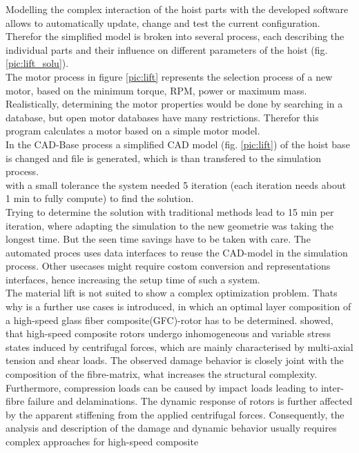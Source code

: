 Modelling the complex interaction of the hoist parts with the developed software allows to automatically update, change and test the current configuration.
Therefor the simplified model is broken into several process, each describing the individual parts and their influence on different parameters of the hoist (fig. \ref{pic:lift_solu}).\\
The motor process in figure \ref{pic:lift} represents the selection process of a new motor, based on the minimum torque, RPM, power or maximum mass.
Realistically, determining the motor properties would be done by searching in a database, but open motor databases have many restrictions.
Therefor this program calculates a motor based on a simple motor model.\\
In the CAD-Base process a simplified CAD model (fig. \ref{pic:lift}) of the hoist base is changed and file is generated, which is than transfered to the simulation process.\\
with a small tolerance the system needed 5 iteration (each iteration needs about 1 min to fully compute) to find the solution.\\
Trying to determine the solution with traditional methods lead to 15 min per iteration, where adapting the simulation to the new geometrie was taking the longest time.
But the seen time savings have to be taken with care.
The automated proces uses data interfaces to reuse the CAD-model in the simulation process.
Other usecases might require costom conversion and representations interfaces, hence increasing the setup time of such a system.\\
The material lift is not suited to show a complex optimization problem.
Thats why is a further use cases is introduced, 
in which an optimal layer composition of a 
high-speed glass fiber composite(GFC)-rotor has to be determined.
\cite{filippatos_damage_2017} showed,
that high-speed composite rotors undergo inhomogeneous and variable stress states induced
by centrifugal forces, which are mainly characterised by multi-axial tension and shear
loads.
The observed damage behavior is closely joint with the composition of the fibre-matrix, 
what increases the structural complexity.
Furthermore, compression loads can be caused by impact loads leading to inter-fibre failure and delaminations.
The dynamic response of rotors is further affected by the apparent stiffening from
the applied centrifugal forces. 
Consequently, the analysis and description of the damage
and dynamic behavior usually requires complex approaches for high-speed composite
